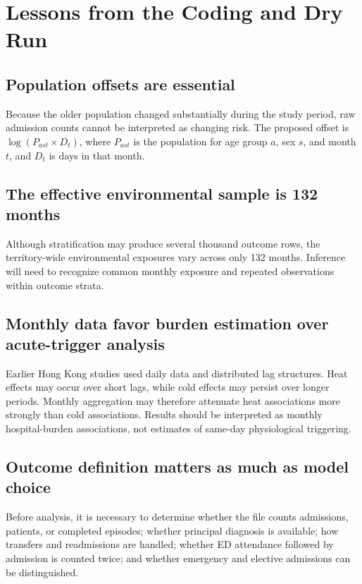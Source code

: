 \documentclass[11pt]{article}
\begin{document}
\section{Lessons from the Coding and Dry Run}

\subsection{Population offsets are essential}

Because the older population changed substantially during the study period,
raw admission counts cannot be interpreted as changing risk. The proposed
offset is $\log(P_{ast}\times D_t)$, where $P_{ast}$ is the population for
age group $a$, sex $s$, and month $t$, and $D_t$ is days in that month.

\subsection{The effective environmental sample is 132 months}

Although stratification may produce several thousand outcome rows, the
territory-wide environmental exposures vary across only 132 months. Inference
will need to recognize common monthly exposure and repeated observations
within outcome strata.

\subsection{Monthly data favor burden estimation over acute-trigger analysis}

Earlier Hong Kong studies used daily data and distributed lag structures.
Heat effects may occur over short lags, while cold effects may persist over
longer periods. Monthly aggregation may therefore attenuate heat associations
more strongly than cold associations. Results should be interpreted as monthly
hospital-burden associations, not estimates of same-day physiological
triggering.

\subsection{Outcome definition matters as much as model choice}

Before analysis, it is necessary to determine whether the file counts
admissions, patients, or completed episodes; whether principal diagnosis is
available; how transfers and readmissions are handled; whether ED attendance
followed by admission is counted twice; and whether emergency and elective
admissions can be distinguished.
\end{document}
